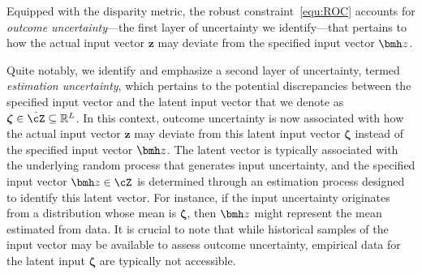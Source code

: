 \documentclass[opre, blindrev]{informs4}
\newcommand{\1}[1]{\mathds{1}{\left(#1\right)}}
\begin{document}

Equipped with the disparity metric, the robust constraint~\eqref{equ:ROC} accounts for \textit{outcome uncertainty}---the first layer of uncertainty we identify---that pertains to how the actual input vector $\bm z$ may deviate from the specified input vector $\bmh z$.

Quite notably, we identify and emphasize a second layer of uncertainty, termed \textit{estimation uncertainty}, which pertains to the potential discrepancies between the specified input vector and the latent input vector that we denote as $\bm{\zeta} \in \hat{\cZ} \subseteq \mathbb{R}^L$. In this context, outcome uncertainty is now associated with how the actual input vector $\bm z$ may deviate from this latent input vector $\bm{\zeta}$ instead of the specified input vector $\bmh z$. The latent vector is typically associated with the underlying random process that generates input uncertainty, and the specified input vector $\bmh z \in \cZ$ is determined through an estimation process designed to identify this latent vector. For instance, if the input uncertainty originates from a distribution whose mean is $\bm \zeta$, then $\bmh z$ might represent the mean estimated from data. It is crucial to note that while historical samples of the input vector may be available to assess outcome uncertainty, empirical data for the latent input $\bm \zeta$ are typically not accessible.
\end{document}
